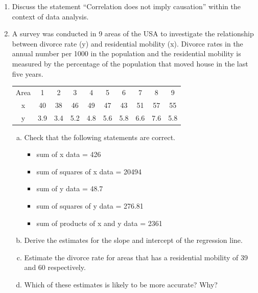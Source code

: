 \documentclass[a4paper,12pt]{article}
\begin{document}
\begin{enumerate}

\item Discuss the statement “Correlation does not imply causation” within the context of data analysis.

\item A survey was conducted in 9 areas of the USA to investigate the relationship between divorce rate (y) and residential mobility (x). Divorce rates in the annual number per 1000 in the population and the residential mobility is measured by the percentage of the population that moved house in the last five years.

\begin{center}
\begin{tabular}{|c|c|c|c|c|c|c|c|c|c|}
	\hline
	Area & 1 & 2 & 3 & 4 & 5 & 6 & 7 & 8 & 9  \\
	x & 40 & 38 & 46 & 49 & 47 & 43 & 51 & 57 & 55\\
	y & 3.9 & 3.4 & 5.2 & 4.8 & 5.6 & 5.8 & 6.6 & 7.6 & 5.8\\
	\hline
\end{tabular}
\end{center}

\begin{enumerate}[(a)]
	\item Check that the following statements are correct.
	
	\begin{itemize}
		\item sum of x data = 426
		\item sum of squares of x data = 20494
		\item sum of y data = 48.7
		\item sum of squares of y data = 276.81
		\item sum of products of x and y data = 2361
	\end{itemize}
	
	\item Derive the estimates for the slope and intercept of the regression line.
	\item Estimate the divorce rate for areas that has a residential mobility of 39 and 60 respectively.
	\item Which of these estimates is likely to be more accurate? Why?
	
\end{enumerate}



\end{enumerate}
\end{document}
